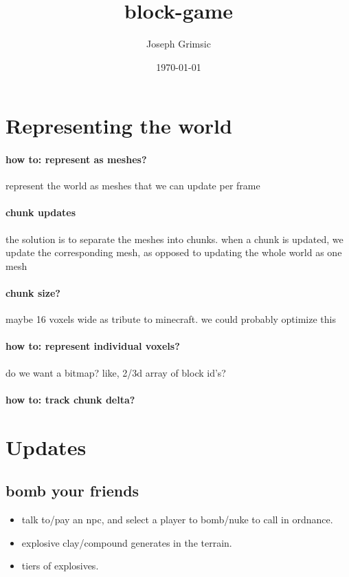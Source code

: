 \documentclass{article}
\title{block-game}
\author{Joseph Grimsic}
\date{\today}
\begin{document}
\maketitle


\section*{Representing the world}
\paragraph*{how to: represent as meshes?}
represent the world as meshes that we can update per frame

\paragraph*{chunk updates}
the solution is to separate the meshes into chunks. when a chunk is
updated, we update the corresponding mesh, as opposed to updating the
whole world as one mesh

\paragraph*{chunk size?}
maybe 16 voxels wide as tribute to minecraft. we could probably optimize this

\paragraph*{how to: represent individual voxels?}
do we want a bitmap? like, 2/3d array of block id's?

\paragraph*{how to: track chunk delta? }

\newpage

\section*{Updates}

\subsection*{bomb your friends}
\begin{itemize}
  \item talk to/pay an npc, and select a player to bomb/nuke to call
    in ordnance.
  \item explosive clay/compound generates in the terrain.
  \item tiers of explosives.
\end{itemize}
\end{document}
